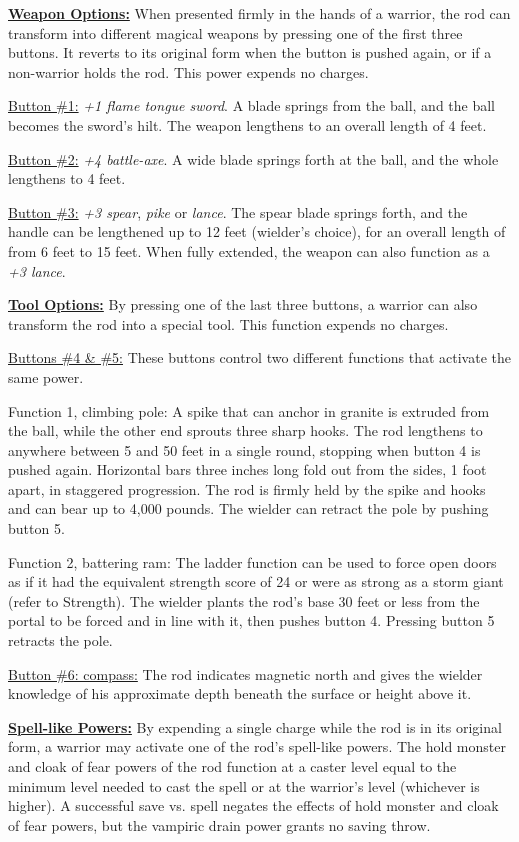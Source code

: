 \begin{multicols}{2}
\underline{\textbf{Weapon Options:}} When presented firmly in the hands of a warrior, the rod can transform into different magical weapons by pressing one of the first three buttons.  It reverts to its original form when the button is pushed again, or if a non-warrior holds the rod.  This power expends no charges.  

\underline{Button \#1:} \textit{+1 flame tongue sword}.  A blade springs from the ball, and the ball becomes the sword's hilt. The weapon lengthens to an overall length of 4 feet.

\underline{Button \#2:} \textit{+4 battle-axe}.  A wide blade springs forth at the ball, and the whole lengthens to 4 feet.

\underline{Button \#3:} \textit{+3 spear}, \textit{pike} or \textit{lance}.  The spear blade springs forth, and the handle can be lengthened up to 12 feet (wielder's choice), for an overall length of from 6 feet to 15 feet. When fully extended, the weapon can also function as a \textit{+3 lance}.

\underline{\textbf{Tool Options:}} By pressing one of the last three buttons, a warrior can also transform the rod into a special tool.  This function expends no charges.

\underline{Buttons \#4 \& \#5:} These buttons control two different functions that activate the same power.

Function 1, climbing pole:  A spike that can anchor in granite is extruded from the ball, while the other end sprouts three sharp hooks.  The rod lengthens to anywhere between 5 and 50 feet in a single round, stopping when button 4 is pushed again.  Horizontal bars three inches long fold out from the sides, 1 foot apart, in staggered progression.  The rod is firmly held by the spike and hooks and can bear up to 4,000 pounds.  The wielder can retract the pole by pushing button 5.

Function 2, battering ram:  The ladder function can be used to force open doors as if it had the equivalent strength score of 24 or were as strong as a storm giant (refer to Strength).  The wielder plants the rod's base 30 feet or less from the portal to be forced and in line with it, then pushes button 4.  Pressing button 5 retracts the pole.

\underline{Button \#6: compass:}  The rod indicates magnetic north and gives the wielder knowledge of his approximate depth beneath the surface or height above it.

\underline{\textbf{Spell-like Powers:}} By expending a single charge while the rod is in its original form, a warrior may activate one of the rod's spell-like powers.  The hold monster and cloak of fear powers of the rod function at a caster level equal to the minimum level needed to cast the spell or at the warrior's level (whichever is higher).  A successful save vs. spell negates the effects of hold monster and cloak of fear powers, but the vampiric drain power grants no saving throw.


\end{multicols}
